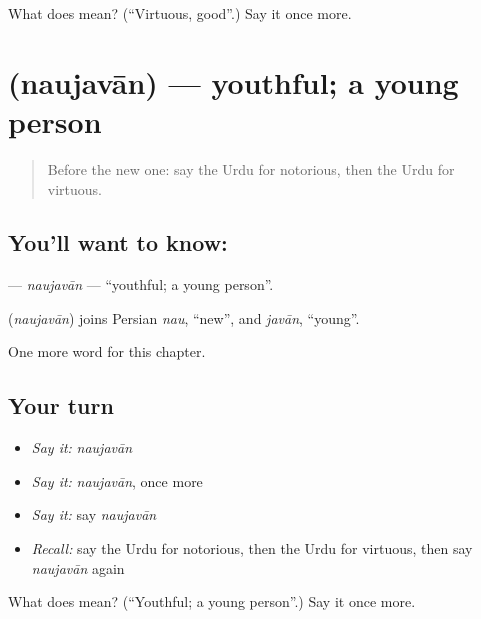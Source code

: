 \begin{tcolorbox}[breakable,colback=teal!4,colframe=teal!35!black,title={Before you move on}]
What does  mean? (\textquotedblleft{}Virtuous, good\textquotedblright{}.) Say it once more.
\end{tcolorbox}
\section[\texorpdfstring{\ur{نوجوان} (naujavān)}{نوجوان (naujavān)}]{ (naujavān) — youthful; a young person}

\label{lesson:UR-C196-naujavan}



\begin{quote}
Before the new one: say the Urdu for notorious, then the Urdu for virtuous.
\end{quote}

\subsection*{You'll want to know: }
\textbf{} — \emph{naujavān} — \textquotedblleft{}youthful; a young person\textquotedblright{}.

\begin{cousinweb}
\textbf{} (\emph{naujavān}) joins Persian \emph{nau}, \textquotedblleft{}new\textquotedblright{}, and \emph{javān}, \textquotedblleft{}young\textquotedblright{}.
\end{cousinweb}

\begin{grammarlens}[title={What you've built}]
One more word for this chapter.
\end{grammarlens}

\subsection*{Your turn}
\begin{itemize}
\raggedright
  \item \emph{Say it:} \emph{naujavān}
  \item \emph{Say it:} \emph{naujavān}, once more
  \item \emph{Say it:} say \emph{naujavān}
  \item \emph{Recall:} say the Urdu for notorious, then the Urdu for virtuous, then say \emph{naujavān} again
\end{itemize}

\begin{tcolorbox}[breakable,colback=teal!4,colframe=teal!35!black,title={Before you move on}]
What does  mean? (\textquotedblleft{}Youthful; a young person\textquotedblright{}.) Say it once more.
\end{tcolorbox}

